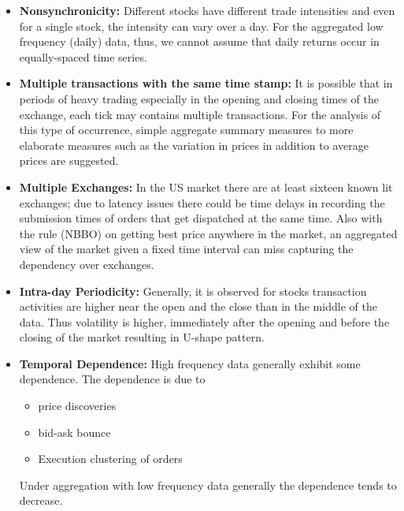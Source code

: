 \begin{itemize}
\item \textbf{Nonsynchronicity:} Different stocks have different trade intensities and even for a single stock, the intensity can vary over a day. For the aggregated low frequency (daily) data, thus, we cannot assume that daily returns occur in equally-spaced time series.

\item \textbf{Multiple transactions with the same time stamp:} It is possible that in periods of heavy trading especially in the opening and closing times of the exchange, each tick may contains multiple transactions. For the analysis of this type of occurrence, simple aggregate summary measures to more elaborate measures such as the variation in prices in addition to average prices are suggested.

\item \textbf{Multiple Exchanges:} In the US market there are at least sixteen known lit exchanges; due to latency issues there could be time delays in recording the submission times of orders that get dispatched at the same time. Also with the rule (NBBO) on getting best price anywhere in the market, an aggregated view of the market given a fixed time interval can miss capturing the dependency over exchanges. 

\item \textbf{Intra-day Periodicity:} Generally, it is observed for stocks transaction activities are higher near the open and the close than in the middle of the data. Thus volatility is higher, immediately after the opening and before the closing of the market resulting in U-shape pattern.

\item \textbf{Temporal Dependence:} High frequency data generally exhibit some dependence. The dependence is due to
    \begin{itemize}
    \item price discoveries
    \item bid-ask bounce
    \item Execution clustering of orders
    \end{itemize}
Under aggregation with low frequency data generally the dependence tends to decrease.


\end{itemize}
